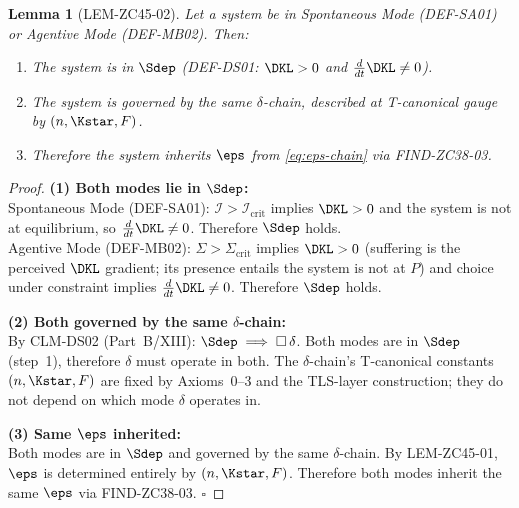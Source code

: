 \documentclass[12pt, a4paper]{article}
\newtheorem{lemma}{Lemma}[section]
\begin{document}

\begin{formalbox}[title={LEM-ZC45-02: Spontaneous Mode and
  Agentive Mode Are Both in $\Sdep$ and Governed by the Same
  $\delta$-Chain (Derived)}]

\begin{lemma}[LEM-ZC45-02]
\label{lem:zc45-02}
Let a system be in Spontaneous Mode (DEF-SA01) or Agentive
Mode (DEF-MB02). Then:
\begin{enumerate}[leftmargin=*, noitemsep, itemsep=3pt]
\item The system is in $\Sdep$
  (DEF-DS01: $\DKL > 0$ and $\tfrac{d}{dt}\DKL \neq 0$).
\item The system is governed by the same $\delta$-chain,
  described at T-canonical gauge by $(n, \Kstar, F)$.
\item Therefore the system inherits $\eps$ from
  \eqref{eq:eps-chain} via FIND-ZC38-03.
\end{enumerate}
\end{lemma}

\begin{proof}
\textbf{(1) Both modes lie in $\Sdep$:}\\
Spontaneous Mode (DEF-SA01): $\mathcal{I} >
\mathcal{I}_{\mathrm{crit}}$ implies $\DKL > 0$ and the
system is not at equilibrium, so $\tfrac{d}{dt}\DKL \neq 0$.
Therefore $\Sdep$ holds.\\
Agentive Mode (DEF-MB02): $\Sigma > \Sigma_{\mathrm{crit}}$
implies $\DKL > 0$ (suffering is the perceived $\DKL$ gradient;
its presence entails the system is not at $P$) and choice
under constraint implies $\tfrac{d}{dt}\DKL \neq 0$.
Therefore $\Sdep$ holds.

\medskip
\textbf{(2) Both governed by the same $\delta$-chain:}\\
By CLM-DS02 (Part~B/XIII): $\Sdep \implies \square\,\delta$.
Both modes are in $\Sdep$ (step~1), therefore $\delta$ must
operate in both. The $\delta$-chain's T-canonical constants
$(n, \Kstar, F)$ are fixed by Axioms~0--3 and the TLS-layer
construction; they do not depend on which mode $\delta$
operates in.

\medskip
\textbf{(3) Same $\eps$ inherited:}\\
Both modes are in $\Sdep$ and governed by the same
$\delta$-chain. By LEM-ZC45-01, $\eps$ is determined entirely
by $(n, \Kstar, F)$. Therefore both modes inherit the same
$\eps$ via FIND-ZC38-03.
\hfill$\square$
\end{proof}
\end{formalbox}
\end{document}
